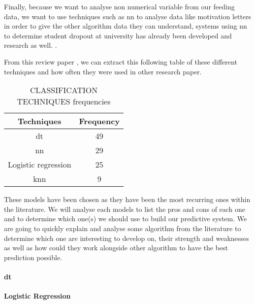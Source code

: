 \documentclass[../../main.tex]{subfiles}
\begin{document}
Finally, because we want to analyse non numerical variable from our feeding data, we want to use techniques such as \acrfull{nn} to analyse data like motivation letters in order to give the other algorithm data they can understand, systems using \acrfull{nn} to determine student dropout at university has already been developed and research as well. \cite{m_alban_she_is_with_the_faculty_of_engineering_and_applied_sciences_of_the_technical_university_cotopaxi_neural_2019, siri_predicting_2015, viloria_integration_2019, zhang_neural_2000}.


From this review paper \cite{agrusti_university_2019}, we can extract this following table of these different techniques and how often they were used in other research paper.
\begin{table}
    \centering
    \caption{CLASSIFICATION TECHNIQUES frequencies\cite{agrusti_university_2019}}
    \begin{tabular}{|c|c|}
        \hline
        \textbf{Techniques} & \textbf{Frequency}\\
        \hline
        \acrlong{dt} & 49\\
        \hline
        \acrlong{nn} & 29\\
        \hline
        Logistic regression & 25\\
        \hline
        \acrshort{knn} & 9\\
        \hline
    \end{tabular}
    \label{tab:class_tech_freq_agrusti}
\end{table}
These models have been chosen as they have been the most recurring ones within the literature. We will analyse each models to list the pros and cons of each one and to determine which one(s) we should use to build our predictive system.
We are going to quickly explain and analyse some algorithm from the literature to determine which one are interesting to develop on, their strength and weaknesses as well as how could they work alongside other algorithm to have the best prediction possible.

\vspace{8pt}
\paragraph{\acrfull{dt}}


\vspace{8pt}
\paragraph{Logistic Regression}

\end{document}
